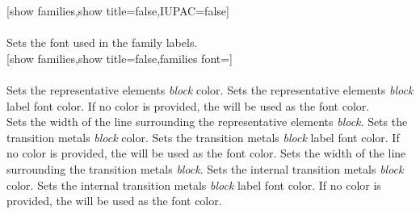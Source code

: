 [show families,show title=false,IUPAC=false]%
\\ [5pt]\makebox[\linewidth][c]{\scalebox{.6}{\pgfPT[show families,show title=false,IUPAC=false]}}%
\\ [0pt]\pgfPTendoption%
\label{option_families font}%
%
{Sets the font used in the family labels.}%
\\ [5pt][show families,show title=false,families font=\string\normalsize]%
\\ [5pt]\makebox[\linewidth][c]{\scalebox{.6}{\pgfPT[show families,show title=false,families font=\normalsize]}}%
\\ [0pt]\pgfPTendoption%
\label{option_r family color}%
%
{Sets the representative elements \textit{block} color.}%
\label{option_r fanily_font color}%
%
{Sets the representative elements \textit{block} label font color. If no color is provided, the  will be used as the font color.}%
\newpage\ \\ [-32pt]%
\label{option_r family line width}%
%
{Sets the width of the line surrounding the representative elements \textit{block}.}%
\label{option_tm family color}%
%
{Sets the transition metals \textit{block} color.}%
\label{option_tm fanily_font color}%
%
{Sets the transition metals \textit{block} label font color. If no color is provided, the  will be used as the font color.}%
\label{option_tm family line width}%
%
{Sets the width of the line surrounding the transition metals \textit{block}.}%
\label{option_itm family color}%
%
{Sets the internal transition metals \textit{block} color.}%
\label{option_itm family_font color}%
%
{Sets the internal transition metals \textit{block} label font color. If no color is provided, the  will be used as the font color.}%
